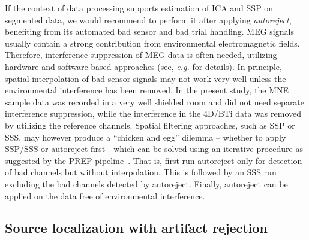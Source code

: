 If the context of data processing supports estimation of ICA and SSP on segmented data, we would recommend to perform it after applying \emph{autoreject}, benefiting from its automated bad sensor and bad trial handling. MEG signals usually contain a strong contribution from environmental electromagnetic fields. Therefore, interference suppression of MEG data is often needed, utilizing hardware and software based approaches (see, \textit{e.g.} \citet{parkkonen:2010} for details). In principle, spatial interpolation of bad sensor signals may not work very well unless the environmental interference has been removed. In the present study, the MNE sample data was recorded in a very well shielded room and did not need separate interference suppression, while the interference in the 4D/BTi data was removed by utilizing the reference channels. Spatial filtering approaches, such as SSP or SSS, may however produce a ``chicken and egg'' dilemma -- whether to apply SSP/SSS or autoreject first - which can be solved using an iterative procedure as suggested by the PREP pipeline~\citep{bigdely2015prep}. That is, first run autoreject only for detection of bad channels but without interpolation. This is followed by an SSS run excluding the bad channels detected by autoreject. Finally, autoreject can be applied on the data free of environmental interference.

\subsection{Source localization with artifact rejection}

